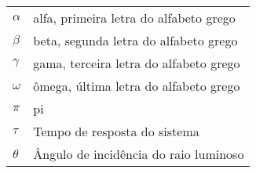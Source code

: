 

\begin{listasimb}

\begin{longtable}{ll}
$\alpha$ & alfa, primeira letra do alfabeto grego\\
$\beta$ & beta, segunda letra do alfabeto grego\\
$\gamma$ & gama, terceira letra do alfabeto grego\\
$\omega$ & ômega, última letra do alfabeto grego\\
$\pi$ & pi \\
$\tau$ & Tempo de resposta do sistema\\
$\theta$ & Ângulo de incidência do raio luminoso\\
\end{longtable}

\end{listasimb}


